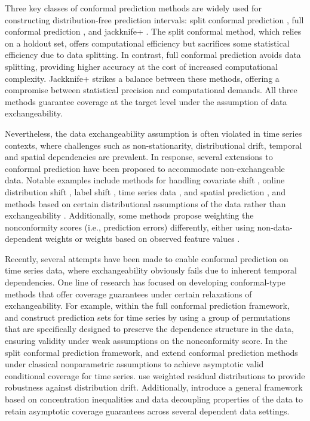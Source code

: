 \documentclass[
  11pt,
  a4paper,
]{article}
\theoremstyle{plain}
\theoremstyle{remark}
\begin{document}
Three key classes of conformal prediction methods are widely used for
constructing distribution-free prediction intervals: split conformal
prediction \autocite{vovk2005}, full conformal prediction
\autocite{vovk2005}, and jackknife+ \autocite{barber2021}. The split
conformal method, which relies on a holdout set, offers computational
efficiency but sacrifices some statistical efficiency due to data
splitting. In contrast, full conformal prediction avoids data splitting,
providing higher accuracy at the cost of increased computational
complexity. Jackknife+ strikes a balance between these methods, offering
a compromise between statistical precision and computational demands.
All three methods guarantee coverage at the target level under the
assumption of data exchangeability.

Nevertheless, the data exchangeability assumption is often violated in
time series contexts, where challenges such as non-stationarity,
distributional drift, temporal and spatial dependencies are prevalent.
In response, several extensions to conformal prediction have been
proposed to accommodate non-exchangeable data. Notable examples include
methods for handling covariate shift
\autocite{tibshirani2019,lei2021,yang2024}, online distribution shift
\autocite{gibbs2021,zaffran2022,bastani2022}, label shift
\autocite{podkopaev2021}, time series data
\autocite{chernozhukov2018,gibbs2021,xu2021,xu2023,zaffran2022}, and
spatial prediction \autocite{mao2024}, and methods based on certain
distributional assumptions of the data rather than exchangeability
\autocite{oliveira2024,xu2021,xu2023}. Additionally, some methods
propose weighting the nonconformity scores (i.e., prediction errors)
differently, either using non-data-dependent weights
\autocite{barber2023} or weights based on observed feature values
\autocite{tibshirani2019,guan2023,hore2023}.

Recently, several attempts have been made to enable conformal prediction
on time series data, where exchangeability obviously fails due to
inherent temporal dependencies. One line of research has focused on
developing conformal-type methods that offer coverage guarantees under
certain relaxations of exchangeability. For example, within the full
conformal prediction framework, \textcite{chernozhukov2018} and
\textcite{yu2022} construct prediction sets for time series by using a
group of permutations that are specifically designed to preserve the
dependence structure in the data, ensuring validity under weak
assumptions on the nonconformity score. In the split conformal
prediction framework, \textcite{xu2021} and \textcite{xu2023} extend
conformal prediction methods under classical nonparametric assumptions
to achieve asymptotic valid conditional coverage for time series.
\textcite{barber2023} use weighted residual distributions to provide
robustness against distribution drift. Additionally,
\textcite{oliveira2024} introduce a general framework based on
concentration inequalities and data decoupling properties of the data to
retain asymptotic coverage guarantees across several dependent data
settings.
\end{document}
